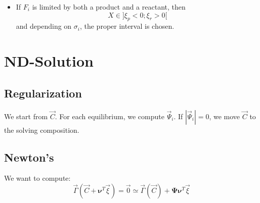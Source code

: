 \documentclass[aps,12pt]{revtex4}
\begin{document}
\begin{itemize}
\begin{itemize}
	\item If $F_i$ is limited by both a product and a reactant, then $$X\in\rbrack \xi_p < 0 ; \xi_r > 0 \lbrack$$
	and depending on $\sigma_i$, the proper interval is chosen.
	\end{itemize}
	
\end{itemize}

\section{ND-Solution} 	

\subsection{Regularization}
We start from $\vec{C}$. For each equilibrium, we compute $\vec{\Psi}_i$.
If $|\vec{\Psi}_i|=0$, we move $\vec{C}$ to the solving composition.

\subsection{Newton's}
We want to compute:
\begin{equation}
	\vec{\Gamma} (\vec{C}+\bm{\nu}^T \vec{\xi}) = \vec{0} \simeq \vec{\Gamma}(\vec{C}) + \bm{\Psi} \bm{\nu}^T \vec{\xi}
\end{equation}
\end{document}
